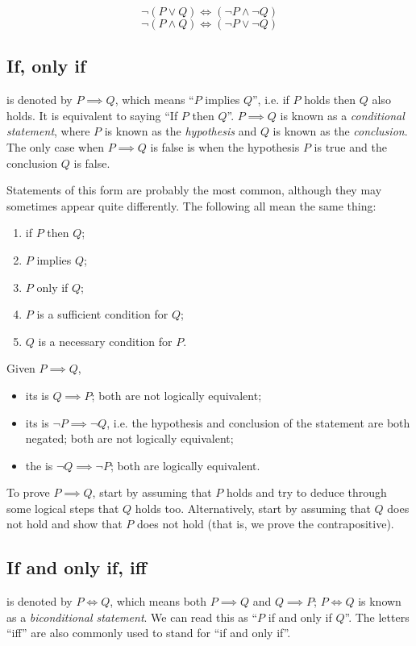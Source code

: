 \begin{proposition}
\[ \lnot(P \lor Q) \iff (\lnot P \land \lnot Q) \]
\[ \lnot (P\land Q) \iff (\lnot P\lor \lnot Q) \]
\end{proposition}

\subsection{If, only if}
 is denoted by $P \implies Q$, which means ``$P$ implies $Q$'', i.e. if $P$ holds then $Q$ also holds. It is equivalent to saying ``If $P$ then $Q$''. $P \implies Q$ is known as a \emph{conditional statement}, where $P$ is known as the \emph{hypothesis} and $Q$ is known as the \emph{conclusion}. The only case when $P \implies Q$ is false is when the hypothesis $P$ is true and the conclusion $Q$ is false.

Statements of this form are probably the most common, although they may sometimes appear quite differently. The following all mean the same thing:
\begin{enumerate}[label=(\roman*)]
\item if $P$ then $Q$;
\item $P$ implies $Q$;
\item $P$ only if $Q$;
\item $P$ is a sufficient condition for $Q$;
\item $Q$ is a necessary condition for $P$.
\end{enumerate}

Given $P\implies Q$,
\begin{itemize}
\item its  is $Q \implies P$; both are not logically equivalent;
\item its  is $\lnot P \implies \lnot Q$, i.e. the hypothesis and conclusion of the statement are both negated; both are not logically equivalent;
\item the  is $\lnot Q\implies\lnot P$; both are logically equivalent.
\end{itemize}

To prove $P \implies Q$, start by assuming that $P$ holds and try to deduce through some logical steps that $Q$ holds too. Alternatively, start by assuming that $Q$ does not hold and show that $P$ does not hold (that is, we prove the contrapositive).

\subsection{If and only if, iff}
 is denoted by $P \iff Q$, which means both $P \implies Q$ and $Q \implies P$; $P \iff Q$ is known as a \emph{biconditional statement}. We can read this as ``$P$ if and only if $Q$''. The letters ``iff'' are also commonly used to stand for ``if and only if''.

